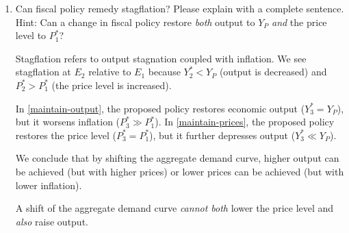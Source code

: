 \documentclass[
    letterpaper,paper=portrait,fleqn,
    DIV=16,fontsize=12pt,twoside=semi,
    parskip=full-,
    headings=standardclasses]
{scrartcl}
\begin{document}
\begin{enumerate}
\begin{solution}
\end{solution}

\item Can fiscal policy remedy stagflation? Please explain with a complete sentence.  \\ {\footnotesize Hint: Can a change in fiscal policy restore \emph{both} output to $Y_P$ \emph{and} the price level to $P^*_1$?}

\begin{solution}
Stagflation refers to output stagnation coupled with inflation. We see stagflation at $E_2$ relative to $E_1$ because $Y^*_2<Y_P$ (output is decreased) and $P^*_2>P^*_1$ (the price level is increased).

In \cref{maintain-output}, the proposed policy restores economic output ($Y^*_3=Y_P$), but it worsens inflation ($P^*_3 \gg P^*_1$). In \cref{maintain-prices}, the proposed policy restores the price level ($P^*_3=P^*_1$), but it further depresses output ($Y^*_3 \ll Y_P$).

We conclude that by shifting the aggregate demand curve, higher output can be achieved (but with higher prices) or lower prices can be achieved (but with lower inflation).

A shift of the aggregate demand curve \emph{cannot both} lower the price level and \emph{also} raise output.
\end{solution}

\end{enumerate}
\end{document}

